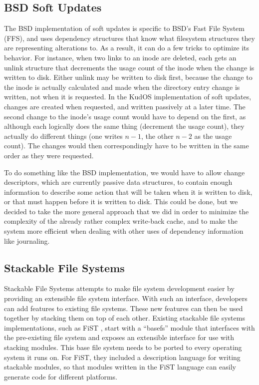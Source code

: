 \subsection{BSD Soft Updates}

The BSD implementation of soft updates \cite{ganger00soft} is specific to BSD's
Fast File System (FFS), and uses dependency structures that know what filesystem
structures they are representing alterations to. As a result, it can do a few
tricks to optimize its behavior. For instance, when two links to an inode are
deleted, each gets an unlink structure that decrements the usage count of the
inode when the change is written to disk. Either unlink may be written to disk
first, because the change to the inode is actually calculated and made when the
directory entry change is written, not when it is requested. In the KudOS
implementation of soft updates, changes are created when requested, and written
passively at a later time. The second change to the inode's usage count would
have to depend on the first, as although each logically does the same thing
(decrement the usage count), they actually do different things (one writes $n -
1$, the other $n - 2$ as the usage count). The changes would then
correspondingly have to be written in the same order as they were requested.

To do something like the BSD implementation, we would have to allow change
descriptors, which are currently passive data structures, to contain enough
information to describe some action that will be taken when it is written to
disk, or that must happen before it is written to disk. This could be done, but
we decided to take the more general approach that we did in order to minimize
the complexity of the already rather complex write-back cache, and to make the
system more efficient when dealing with other uses of dependency information
like journaling.

\subsection{Stackable File Systems}

Stackable File Systems \cite{heidemann93stack} attempts to make file system
development easier by providing an extensible file system interface. With such
an interface, developers can add features to existing file systems. These new
features can then be used together by stacking them on top of each other.
Existing stackable file systems implementations, such as FiST
\cite{zadok00fist}, start with a ``basefs'' module that interfaces with the
pre-existing file system and exposes an extensible interface for use with
stacking modules. This base file system needs to be ported to every operating
system it runs on. For FiST, they included a description language for writing
stackable modules, so that modules written in the FiST language can easily
generate code for different platforms.


